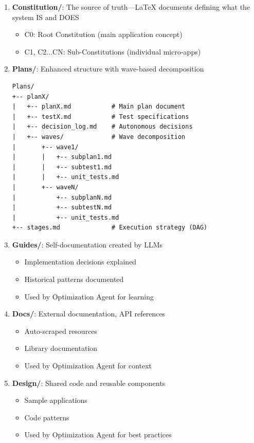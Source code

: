 \documentclass[12pt,letterpaper]{article}
\begin{document}
\begin{enumerate}
    \item \textbf{Constitution/}: The source of truth—LaTeX documents defining what the system IS and DOES
    \begin{itemize}
        \item C0: Root Constitution (main application concept)
        \item C1, C2...CN: Sub-Constitutions (individual micro-apps)
    \end{itemize}
    
    \item \textbf{Plans/}: Enhanced structure with wave-based decomposition
    \begin{verbatim}
Plans/
+-- planX/
|   +-- planX.md           # Main plan document
|   +-- testX.md           # Test specifications
|   +-- decision_log.md    # Autonomous decisions
|   +-- waves/             # Wave decomposition
|       +-- wave1/
|       |   +-- subplan1.md
|       |   +-- subtest1.md
|       |   +-- unit_tests.md
|       +-- waveN/
|           +-- subplanN.md
|           +-- subtestN.md
|           +-- unit_tests.md
+-- stages.md              # Execution strategy (DAG)
    \end{verbatim}
    
    \item \textbf{Guides/}: Self-documentation created by LLMs
    \begin{itemize}
        \item Implementation decisions explained
        \item Historical patterns documented
        \item Used by Optimization Agent for learning
    \end{itemize}
    
    \item \textbf{Docs/}: External documentation, API references
    \begin{itemize}
        \item Auto-scraped resources
        \item Library documentation
        \item Used by Optimization Agent for context
    \end{itemize}
    
    \item \textbf{Design/}: Shared code and reusable components
    \begin{itemize}
        \item Sample applications
        \item Code patterns
        \item Used by Optimization Agent for best practices
    \end{itemize}
\end{enumerate}
\end{document}
